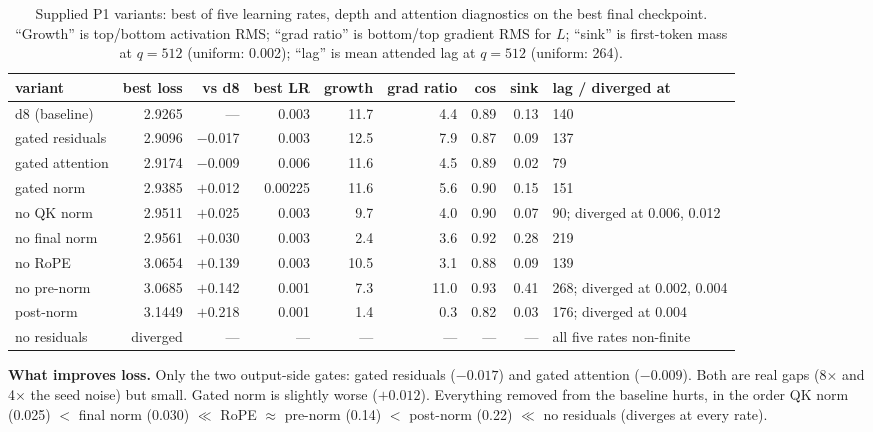 \documentclass[10pt,letterpaper]{article}
\begin{document}
\begin{table}[H]\centering\small
\caption{Supplied P1 variants: best of five learning rates, depth and attention diagnostics on the best final checkpoint. ``Growth'' is top/bottom activation RMS; ``grad ratio'' is bottom/top gradient RMS for $L$; ``sink'' is first-token mass at $q=512$ (uniform: 0.002); ``lag'' is mean attended lag at $q=512$ (uniform: 264).}\label{tab:p1depth}
\begin{tabular}{lrrrrrrrl}
\toprule
variant & best loss & vs d8 & best LR & growth & grad ratio & cos & sink & lag / diverged at \\
\midrule
d8 (baseline)     & 2.9265 & ---    & 0.003   & 11.7 & 4.4  & 0.89 & 0.13 & 140 \\
gated residuals   & 2.9096 & $-$0.017 & 0.003 & 12.5 & 7.9  & 0.87 & 0.09 & 137 \\
gated attention   & 2.9174 & $-$0.009 & 0.006 & 11.6 & 4.5  & 0.89 & 0.02 & 79 \\
gated norm        & 2.9385 & $+$0.012 & 0.00225 & 11.6 & 5.6 & 0.90 & 0.15 & 151 \\
no QK norm        & 2.9511 & $+$0.025 & 0.003 & 9.7  & 4.0  & 0.90 & 0.07 & 90; diverged at 0.006, 0.012 \\
no final norm     & 2.9561 & $+$0.030 & 0.003 & 2.4  & 3.6  & 0.92 & 0.28 & 219 \\
no RoPE           & 3.0654 & $+$0.139 & 0.003 & 10.5 & 3.1  & 0.88 & 0.09 & 139 \\
no pre-norm       & 3.0685 & $+$0.142 & 0.001 & 7.3  & 11.0 & 0.93 & 0.41 & 268; diverged at 0.002, 0.004 \\
post-norm         & 3.1449 & $+$0.218 & 0.001 & 1.4  & 0.3  & 0.82 & 0.03 & 176; diverged at 0.004 \\
no residuals      & diverged & ---  & ---     & ---  & ---  & ---  & ---  & all five rates non-finite \\
\bottomrule
\end{tabular}
\end{table}

\textbf{What improves loss.} Only the two output-side gates: gated residuals ($-0.017$) and gated attention ($-0.009$). Both are real gaps (8$\times$ and 4$\times$ the seed noise) but small. Gated norm is slightly worse ($+0.012$). Everything removed from the baseline hurts, in the order QK norm (0.025) $<$ final norm (0.030) $\ll$ RoPE $\approx$ pre-norm (0.14) $<$ post-norm (0.22) $\ll$ no residuals (diverges at every rate).
\end{document}
